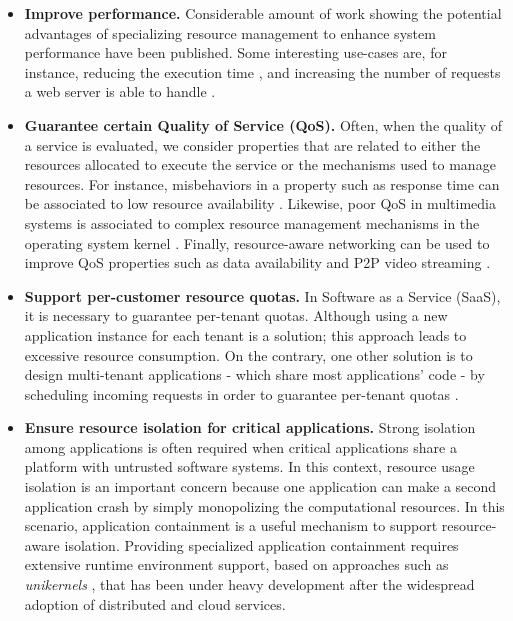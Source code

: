 \begin{itemize}
\item \textbf{Improve performance.}
Considerable amount of work showing the potential advantages of specializing resource management to enhance system performance have been published.
Some interesting use-cases are, for instance, reducing the execution time \cite{Polo:2011:RAS:2414338.2414352}, and increasing the number of requests a web server is able to handle \cite{engler1995exokernel,Belay:2014:IPD:2685048.2685053}.

\item \textbf{Guarantee certain Quality of Service (QoS).} 
Often, when the quality of a service is evaluated, we consider properties that are related to either the resources allocated to execute the service or the mechanisms used to manage resources.
For instance, misbehaviors in a property such as response time can be associated to low resource availability \cite{Chechik-2009,autili2012hybrid}.
Likewise, poor QoS in multimedia systems is associated to complex resource management mechanisms in the operating system kernel \cite{Black1997}.
Finally, resource-aware networking can be used to improve QoS properties such as data availability \cite{Boldrini:2008:CRA:1549824.1550106} and P2P video streaming \cite{Pianese:2007:RLA:1326320.1326323,Alhaisoni:2010:RTO:1664767.1664770}.

\item \textbf{Support per-customer resource quotas.}
In Software as a Service (SaaS), it is necessary to guarantee per-tenant quotas.
Although using a new application instance for each tenant is a solution; this approach leads to excessive resource consumption.
On the contrary, one other solution is to design multi-tenant applications - which share most applications' code - by scheduling incoming requests in order to guarantee per-tenant quotas \cite{KrSpAhKo2014_CCGrid_ResourceIsolation,KrWeKo2013-icwe-MTBenchmark}.    

\item \textbf{Ensure resource isolation for critical applications.}
Strong isolation among applications is often required when critical applications \cite{Knight:2002:SCS:581339.581406} share a platform with untrusted software systems.
In this context, resource usage isolation is an important concern because one application can make a second application crash by simply monopolizing the computational resources.
In this scenario, application containment \cite{Kamp00jails:confining,Soltesz:2007:COS:1272998.1273025,Madhavapeddy:2015:JJS:2789770.2789809} is a useful mechanism to support resource-aware isolation.
Providing specialized application containment requires extensive runtime environment support, based on approaches such as \textit{unikernels} \cite{Madhavapeddy:2013:ULO:2499368.2451167, Kivity:2014:OVO:2643634.2643642, Madhavapeddy:2015:JJS:2789770.2789809}, that has been under heavy development after the widespread adoption of distributed and cloud services.  

\end{itemize}

